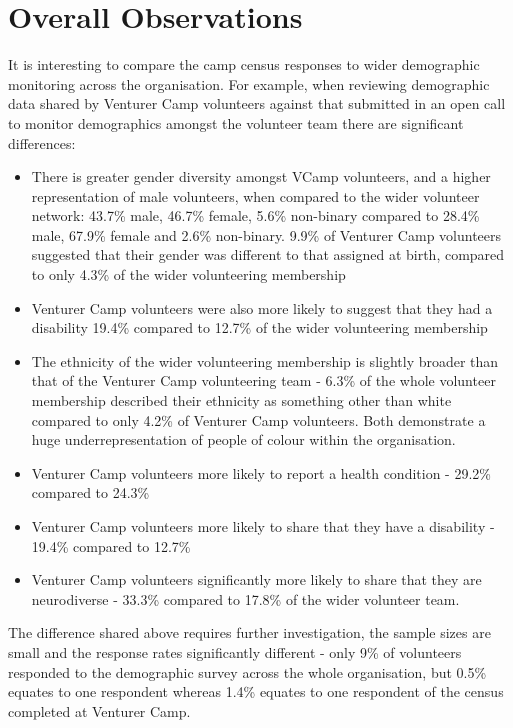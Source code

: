 \section{Overall Observations}
It is interesting to compare the camp census responses to wider demographic monitoring across the organisation. For example, when reviewing demographic data shared by Venturer Camp volunteers against that submitted in an open call to monitor demographics amongst the volunteer team there are significant differences:
\begin{itemize}
    \item There is greater gender diversity amongst VCamp volunteers, and a higher representation of male volunteers, when compared to the wider volunteer network: 43.7\% male, 46.7\% female, 5.6\% non-binary compared to 28.4\% male, 67.9\% female and 2.6\% non-binary. 9.9\% of Venturer Camp volunteers suggested that their gender was different to that assigned at birth, compared to only 4.3\% of the wider volunteering membership
    \item Venturer Camp volunteers were also more likely to suggest that they had a disability 19.4\% compared to 12.7\% of the wider volunteering membership
    \item The ethnicity of the wider volunteering membership is slightly broader than that of the Venturer Camp volunteering team - 6.3\% of the whole volunteer membership described their ethnicity as something other than white compared to only 4.2\% of Venturer Camp volunteers. Both demonstrate a huge underrepresentation of people of colour within the organisation.
    \item Venturer Camp volunteers more likely to report a health condition - 29.2\% compared to 24.3\%
    \item Venturer Camp volunteers more likely to share that they have a disability - 19.4\% compared to 12.7\%
    \item Venturer Camp volunteers significantly more likely to share that they are neurodiverse - 33.3\% compared to 17.8\% of the wider volunteer team.
\end{itemize}
The difference shared above requires further investigation, the sample sizes are small and the response rates significantly different - only 9\% of volunteers responded to the demographic survey across the whole organisation, but 0.5\% equates to one respondent whereas 1.4\% equates to one respondent of the census completed at Venturer Camp. \\

